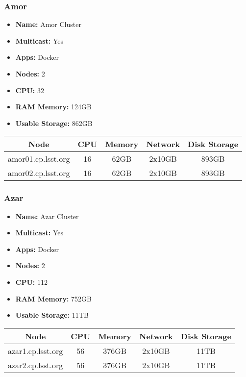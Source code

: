 \subsubsection{Amor}
\begin{itemize}
  \itemsep0em 
  \item \textbf{Name:}       Amor Cluster
  \item \textbf{Multicast:}  Yes
  \item \textbf{Apps:}       Docker
  \item \textbf{Nodes:}      2
  \item \textbf{CPU:}        32
  \item \textbf{RAM Memory:} 124GB
  \item \textbf{Usable Storage:}   862GB
\end{itemize}
\begin{center}
  \small
  \begin{tabular}{||c c c c c||}
    \hline
    \textbf{Node} & \textbf{CPU} & \textbf{Memory} & \textbf{Network} & \textbf{Disk Storage} \\ [0.5ex]
    \hline
    amor01.cp.lsst.org & 16 & 62GB & 2x10GB & 893GB \\
    \hline
    amor02.cp.lsst.org & 16 & 62GB & 2x10GB & 893GB \\
    \hline
  \end{tabular}
\end{center}

\subsubsection{Azar}
\begin{itemize}
  \itemsep0em 
  \item \textbf{Name:}       Azar Cluster
  \item \textbf{Multicast:}  Yes
  \item \textbf{Apps:}       Docker
  \item \textbf{Nodes:}      2
  \item \textbf{CPU:}        112
  \item \textbf{RAM Memory:} 752GB
  \item \textbf{Usable Storage:}   11TB
\end{itemize}
\begin{center}
  \small
  \begin{tabular}{||c c c c c||}
    \hline
    \textbf{Node} & \textbf{CPU} & \textbf{Memory} & \textbf{Network} & \textbf{Disk Storage} \\ [0.5ex]
    \hline
    azar1.cp.lsst.org & 56 & 376GB & 2x10GB & 11TB \\
    \hline
    azar2.cp.lsst.org & 56 & 376GB & 2x10GB & 11TB \\
    \hline
  \end{tabular}
\end{center}

